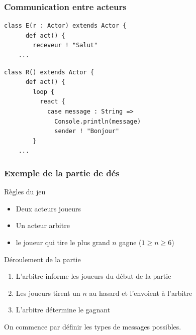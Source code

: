 \documentclass{beamer}
\begin{document}
\begin{frame}[containsverbatim]

  \frametitle{Communication entre acteurs}

  \begin{lstlisting}[frame=single]
    class E(r : Actor) extends Actor {
      def act() {
        receveur ! "Salut"
    ...
  \end{lstlisting}

  \vfill

  \begin{lstlisting}[frame=single]
    class R() extends Actor {
      def act() {
        loop {
          react {
            case message : String =>
              Console.println(message)
              sender ! "Bonjour"
        }
    ...
  \end{lstlisting}

\end{frame}

\begin{frame}

  \frametitle{Exemple de la partie de dés}

  \begin{block}{Règles du jeu}
    \begin{itemize}
    \item{Deux acteurs joueurs}
    \item{Un acteur arbitre}
    \item{le joueur qui tire le plus grand $n$ gagne ($1 \geq n \geq 6$)}
    \end{itemize}
  \end{block}

  \vfill

  \begin{block}{Déroulement de la partie}
    \begin{enumerate}
    \item{L'arbitre informe les joueurs du début de la partie}
    \item{Les joueurs tirent un $n$ au hasard et l'envoient à l'arbitre}
    \item{L'arbitre détermine le gagnant}
    \end{enumerate}
  \end{block}

\end{frame}

\begin{frame}[containsverbatim]

  On commence par définir les types de messages possibles.

  \vfill

  

\end{frame}
\end{document}
